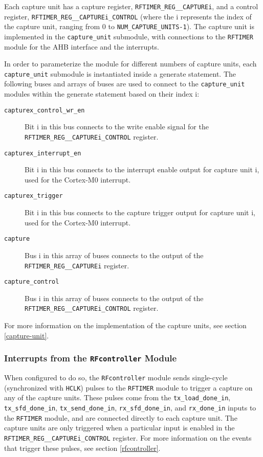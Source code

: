 Each capture unit has a capture register, \texttt{RFTIMER\_REG\_\_CAPTUREi}, and a control register, \texttt{RFTIMER\_REG\_\_CAPTUREi\_CONTROL} (where the i represents the index of the capture unit, ranging from 0 to \texttt{NUM\_CAPTURE\_UNITS-1}). The capture unit is implemented in the \texttt{capture\_unit} submodule, with connections to the \texttt{RFTIMER} module for the AHB interface and the interrupts.

In order to parameterize the module for different numbers of capture units, each \texttt{capture\_unit} submodule is instantiated inside a generate statement. The following buses and arrays of buses are used to connect to the \texttt{capture\_unit} modules within the generate statement based on their index i:

\begin{description}
	\item[\texttt{capturex\_control\_wr\_en}] Bit i in this bus connects to the write enable signal for the \texttt{RFTIMER\_REG\_\_CAPTUREi\_CONTROL} register.
	\item[\texttt{capturex\_interrupt\_en}] Bit i in this bus connects to the interrupt enable output for capture unit i, used for the Cortex-M0 interrupt.
	\item[\texttt{capturex\_trigger}] Bit i in this bus connects to the capture trigger output for capture unit i, used for the Cortex-M0 interrupt.
	\item[\texttt{capture}] Bus i in this array of buses connects to the output of the \texttt{RFTIMER\_REG\-\_\_CAPTUREi} register.
	\item[\texttt{capture\_control}] Bus i in this array of buses connects to the output of the \texttt{RFTIMER\-\_REG\_\_CAPTUREi\_CONTROL} register.
\end{description}

For more information on the implementation of the capture units, see section \ref{capture-unit}.

\subsubsection{Interrupts from the \texttt{RFcontroller} Module}
When configured to do so, the \texttt{RFcontroller} module sends single-cycle (synchronized with \texttt{HCLK}) pulses to the \texttt{RFTIMER} module to trigger a capture on any of the capture units. These pulses come from the \texttt{tx\_load\_done\_in}, \texttt{tx\_sfd\_done\_in}, \texttt{tx\_send\_done\_in}, \texttt{rx\_sfd\_done\_in}, and \texttt{rx\_done\_in} inputs to the \texttt{RFTIMER} module, and are connected directly to each capture unit. The capture units are only triggered when a particular input is enabled in the \texttt{RFTIMER\_REG\_\_CAPTUREi\_CONTROL} register. For more information on the events that trigger these pulses, see section \ref{rfcontroller}.

